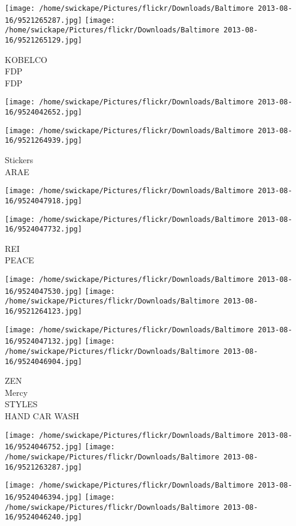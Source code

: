 \documentclass[10pt,letterpaper]{article}
\begin{document}
\vspace{0.25in}
\texttt{[image: /home/swickape/Pictures/flickr/Downloads/Baltimore 2013-08-16/9521265287.jpg]}
\texttt{[image: /home/swickape/Pictures/flickr/Downloads/Baltimore 2013-08-16/9521265129.jpg]}

KOBELCO\\
FDP\\
FDP\\
\pagebreak

\texttt{[image: /home/swickape/Pictures/flickr/Downloads/Baltimore 2013-08-16/9524042652.jpg]}

\vspace{0.25in}
\texttt{[image: /home/swickape/Pictures/flickr/Downloads/Baltimore 2013-08-16/9521264939.jpg]}

Stickers\\
ARAE\\
\pagebreak

\texttt{[image: /home/swickape/Pictures/flickr/Downloads/Baltimore 2013-08-16/9524047918.jpg]}

\vspace{0.25in}
\texttt{[image: /home/swickape/Pictures/flickr/Downloads/Baltimore 2013-08-16/9524047732.jpg]}

REI\\
PEACE\\
\pagebreak

\texttt{[image: /home/swickape/Pictures/flickr/Downloads/Baltimore 2013-08-16/9524047530.jpg]}
\texttt{[image: /home/swickape/Pictures/flickr/Downloads/Baltimore 2013-08-16/9521264123.jpg]}

\texttt{[image: /home/swickape/Pictures/flickr/Downloads/Baltimore 2013-08-16/9524047132.jpg]}
\texttt{[image: /home/swickape/Pictures/flickr/Downloads/Baltimore 2013-08-16/9524046904.jpg]}

ZEN\\
Mercy\\
STYLES\\
HAND CAR WASH\\
\pagebreak

\texttt{[image: /home/swickape/Pictures/flickr/Downloads/Baltimore 2013-08-16/9524046752.jpg]}
\texttt{[image: /home/swickape/Pictures/flickr/Downloads/Baltimore 2013-08-16/9521263287.jpg]}

\texttt{[image: /home/swickape/Pictures/flickr/Downloads/Baltimore 2013-08-16/9524046394.jpg]}
\texttt{[image: /home/swickape/Pictures/flickr/Downloads/Baltimore 2013-08-16/9524046240.jpg]}
\end{document}
